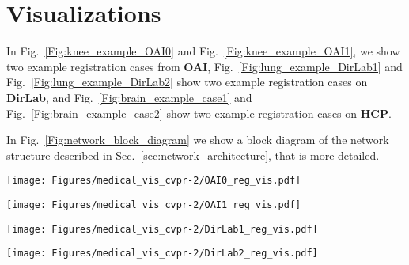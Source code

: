 \section{Visualizations}
\label{appendix:visualizations}
In Fig.~\ref{Fig:knee_example_OAI0} and Fig.~\ref{Fig:knee_example_OAI1}, we show two example
registration cases from \textbf{OAI}, Fig.~\ref{Fig:lung_example_DirLab1} and Fig.~\ref{Fig:lung_example_DirLab2} show two example registration cases on \textbf{DirLab}, and Fig.~\ref{Fig:brain_example_case1} and Fig.~\ref{Fig:brain_example_case2} show two example
registration cases on \textbf{HCP}.

In Fig.~\ref{Fig:network_block_diagram} we show a block diagram of the network structure described in Sec.~\ref{sec:network_architecture}, that is more detailed.
\begin{figure*}
	\texttt{[image: Figures/medical\_vis\_cvpr-2/OAI0\_reg\_vis.pdf]}
	\caption{Example registration case \textbf{A} (from test set instances) performed using \texttt{GradICON} and our standard training protocol ($\dagger$) w/o instance optimization on the \textbf{OAI} dataset. \emph{Best-viewed in color.}\label{Fig:knee_example_OAI0}}
\end{figure*}
\begin{figure*}
	\texttt{[image: Figures/medical\_vis\_cvpr-2/OAI1\_reg\_vis.pdf]}
	\caption{Example registration case \textbf{B} (from test set instances) performed using \texttt{GradICON} and our standard training protocol ($\dagger$) w/o instance optimization on the \textbf{OAI} dataset. \emph{Best-viewed in color.}\label{Fig:knee_example_OAI1}}
\end{figure*}
\begin{figure*}
	\texttt{[image: Figures/medical\_vis\_cvpr-2/DirLab1\_reg\_vis.pdf]}
	\caption{Example registrations case \textbf{A} performed using \texttt{GradICON} and our standard training protocol ($\dagger$) w/o instance optimization on the \textbf{Dirlab} dataset. \emph{Best-viewed in color.}\label{Fig:lung_example_DirLab1}}
\end{figure*}
\begin{figure*}
	\texttt{[image: Figures/medical\_vis\_cvpr-2/DirLab2\_reg\_vis.pdf]}
	\caption{Example registrations case \textbf{B} performed using \texttt{GradICON} and our standard training protocol ($\dagger$) w/o instance optimization on the \textbf{Dirlab} dataset. \emph{Best-viewed in color.}\label{Fig:lung_example_DirLab2}}
\end{figure*}
